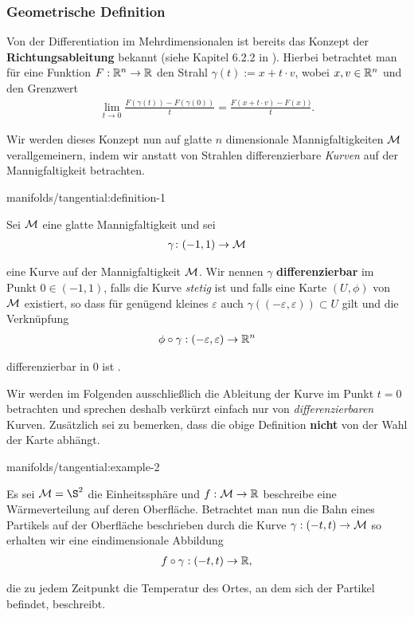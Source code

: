 \subsubsection{Geometrische Definition}
\label{\detokenize{manifolds/tangential:geometrische-definition}}
\par
Von der Differentiation im Mehrdimensionalen ist bereits das Konzept der \textbf{Richtungsableitung} bekannt (siehe Kapitel 6.2.2 in \cite{Ten21}).
Hierbei betrachtet man für eine Funktion \(F:\mathbb{R}^n\to\mathbb{R}\) den Strahl \(\gamma(t):= x + t\cdot v\), wobei \(x,v\in\mathbb{R}^n\) und den Grenzwert
\begin{align*}
\lim_{t\to 0} \frac{F(\gamma(t)) - F(\gamma(0))}{t} = \frac{F(x + t\cdot v) - F(x))}{t}.
\end{align*}
\par
Wir werden dieses Konzept nun auf glatte \(n\) dimensionale Mannigfaltigkeiten \(\mathcal{M}\) verallgemeinern, indem wir anstatt von Strahlen differenzierbare \emph{Kurven} auf der Mannigfaltigkeit betrachten.
\begin{definition}{}{manifolds/tangential:definition-1}



\par
Sei \(\mathcal{M}\) eine glatte Mannigfaltigkeit und sei
\begin{align*}
\gamma \colon (-1,1) \rightarrow \mathcal{M}
\end{align*}
\par
eine Kurve auf der Mannigfaltigkeit \(\mathcal{M}\).
Wir nennen \(\gamma\) \textbf{differenzierbar} im Punkt \(0\in(-1,1)\), falls die Kurve \emph{stetig} ist und falls eine Karte \((U,\phi)\) von \(\mathcal{M}\) existiert, so dass für genügend kleines \(\varepsilon\) auch \(\gamma((-\varepsilon,\varepsilon))\subset U\) gilt und die Verknüpfung
\begin{align*}
\phi \circ \gamma:(-\varepsilon,\varepsilon)\to\mathbb{R}^n
\end{align*}
\par
differenzierbar in \(0\) ist .
\end{definition}

\par
Wir werden im Folgenden ausschließlich die Ableitung der Kurve im Punkt \(t=0\) betrachten und sprechen deshalb verkürzt einfach nur von \emph{differenzierbaren} Kurven.
Zusätzlich sei zu bemerken, dass die obige Definition \textbf{nicht} von der Wahl der Karte abhängt.
\begin{example}{}{manifolds/tangential:example-2}



\par
Es sei \(\M=\S^2\) die Einheitssphäre und \(f:\mathcal{M}\to\mathbb{R}\) beschreibe eine Wärmeverteilung auf deren Oberfläche.
Betrachtet man nun die Bahn eines Partikels auf der Oberfläche beschrieben durch die Kurve \(\gamma:(-t, t)\to \mathcal{M}\) so erhalten wir eine eindimensionale Abbildung
\begin{align*}
f\circ\gamma:(-t,t)\to \mathbb{R},
\end{align*}
\par
die zu jedem Zeitpunkt die Temperatur des Ortes, an dem sich der Partikel befindet, beschreibt.
\end{example}

